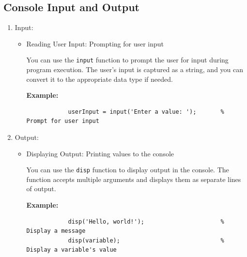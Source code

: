 \documentclass[
11pt, %
a4paper, %
oneside, %
headinclude,footinclude, %
BCOR5mm, %
]{scrartcl}
\begin{document}
\subsection{Console Input and Output}
\begin{enumerate}
	\item Input:
	\begin{itemize}
		\item Reading User Input: Prompting for user input
		
		You can use the \texttt{input} function to prompt the user for input during program execution. The user's input is captured as a string, and you can convert it to the appropriate data type if needed.
		
		\textbf{Example:}
		\begin{verbatim}
			userInput = input('Enter a value: ');       % Prompt for user input
		\end{verbatim}
	\end{itemize}
	
	\item Output:
	\begin{itemize}
		\item Displaying Output: Printing values to the console
		
		You can use the \texttt{disp} function to display output in the console. The function accepts multiple arguments and displays them as separate lines of output.
		
		\textbf{Example:}
		\begin{verbatim}
			disp('Hello, world!');                      % Display a message
			disp(variable);                             % Display a variable's value
		\end{verbatim}
	\end{itemize}
\end{enumerate}
\end{document}
